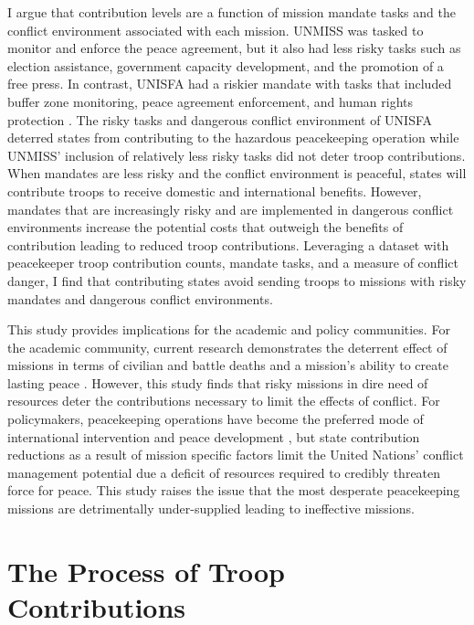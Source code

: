 \documentclass[12pt]{article}
\begin{document}
I argue that contribution levels are a function of mission mandate tasks and the conflict environment associated with each mission. UNMISS was tasked to monitor and enforce the peace agreement, but it also had less risky tasks such as election assistance, government capacity development, and the promotion of a free press. In contrast, UNISFA had a riskier mandate with tasks that included buffer zone monitoring, peace agreement enforcement, and human rights protection \citep{lloyd2021}. The risky tasks and dangerous conflict environment of UNISFA deterred states from contributing to the hazardous peacekeeping operation while UNMISS' inclusion of relatively less risky tasks did not deter troop contributions. When mandates are less risky and the conflict environment is peaceful, states will contribute troops to receive domestic and international benefits. However, mandates that are increasingly risky and are implemented in dangerous conflict environments increase the potential costs that outweigh the benefits of contribution leading to reduced troop contributions. Leveraging a dataset with peacekeeper troop contribution counts, mandate tasks, and a measure of conflict danger, I find that contributing states avoid sending troops to missions with risky mandates and dangerous conflict environments. 

This study provides implications for the academic and policy communities. For the academic community, current research demonstrates the deterrent effect of missions in terms of civilian and battle deaths \citep{hultman2013united,hultman2014beyond} and a mission's ability to create lasting peace \citep{blair2021}. However, this study finds that risky missions in dire need of resources deter the contributions necessary to limit the effects of conflict. For policymakers, peacekeeping operations have become the preferred mode of international intervention and peace development \citep{UN_SC}, but state contribution reductions as a result of mission specific factors limit the United Nations' conflict management potential due a deficit of resources required to credibly threaten force for peace. This study raises the issue that the most desperate peacekeeping missions are detrimentally under-supplied leading to ineffective missions. 

\section*{The Process of Troop Contributions}
\end{document}
